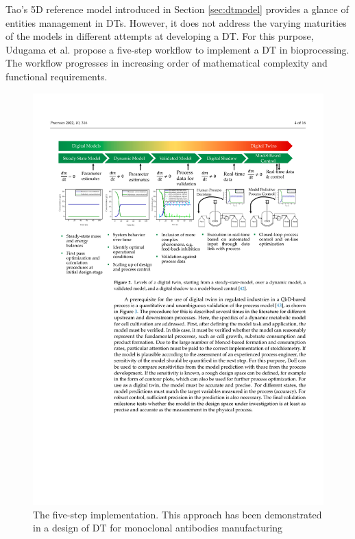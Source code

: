 \documentclass[journal,onecolumn]{IEEEtran} %
\begin{document}
Tao's 5D reference model introduced in Section \ref{sec:dtmodel} provides a glance of entities management in DTs. However, it does not address the varying maturities of the models in different attempts at developing a DT. For this purpose, Udugama et al. \cite{Udugama2021} propose a five-step workflow to implement a DT in bioprocessing. The workflow progresses in increasing order of mathematical complexity and functional requirements.

\begin{figure}[hbt!]
  \centering
  \includegraphics[scale=0.9]{figures/fivestep.pdf}
  \caption{The five-step implementation. This approach has been demonstrated in a design of DT for monoclonal antibodies manufacturing \cite{Helgers2022}}
  \label{fig:fivestep}
\end{figure}
\end{document}
